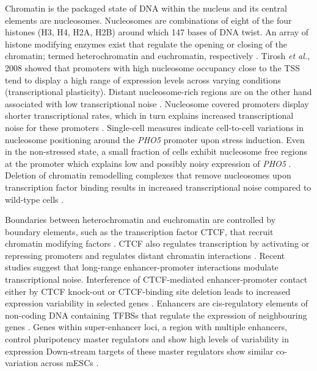 Chromatin is the packaged state of DNA within the nucleus and its central elements are nucleosomes. Nucleosomes are combinations of eight of the four histones (H3, H4, H2A, H2B) around which 147 bases of DNA twist. An array of histone modifying enzymes exist that regulate the opening or closing of the chromatin; termed heterochromatin and euchromatin, respectively \citep{Kouzarides2007}. Tirosh \textit{et al.}, 2008 showed that promoters with high nucleosome occupancy close to the TSS tend to display a high range of expression levels across varying conditions (transcriptional plasticity). Distant nucleosome-rich regions are on the other hand associated with low transcriptional noise \citep{Tirosh2008}. Nucleosome covered promoters display shorter transcriptional rates, which in turn explains increased transcriptional noise for these promoters \cite{Dey2015}. Single-cell measures indicate cell-to-cell variations in nucleosome positioning around the \textit{PHO5} promoter upon stress induction. Even in the non-stressed state, a small fraction of cells exhibit nucleosome free regions at the promoter which explains low and possibly noisy expression of \textit{PHO5} \citep{Small2014}. Deletion of chromatin remodelling complexes that remove nucleosomes upon transcription factor binding results in increased transcriptional noise compared to wild-type cells \citep{Raser2004}. 

\newpage

Boundaries between heterochromatin and euchromatin are controlled by boundary elements, such as the transcription factor \Gls{CTCF}, that recruit chromatin modifying factors \citep{Kouzarides2007}. CTCF also regulates transcription by activating or repressing promoters and regulates distant chromatin interactions \citep{Kim2015a}. Recent studies suggest that long-range enhancer-promoter interactions modulate transcriptional noise. Interference of CTCF-mediated enhancer-promoter contact either by CTCF knock-out or CTCF-binding site deletion leads to increased expression variability in selected genes \citep{Ren2017}. Enhancers are cis-regulatory elements of non-coding DNA containing TFBSs that regulate the expression of neighbouring genes \citep{Blackwood1998}. Genes within super-enhancer loci, a region with multiple enhancers, control pluripotency master regulators and show high levels of variability in expression Down-stream targets of these master regulators show similar co-variation across mESCs \citep{Faure2017}.

